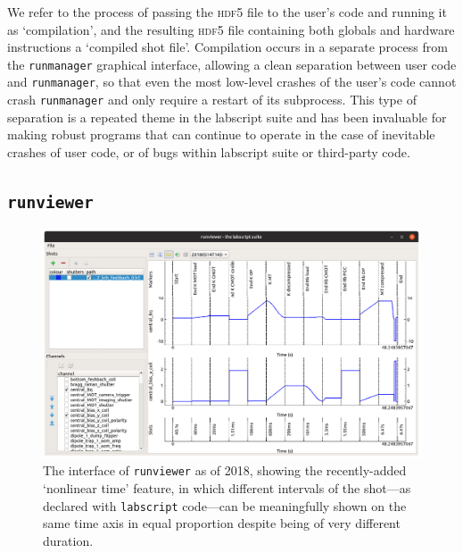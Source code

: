 We refer to the process of passing the \textsc{hdf5} file to the user's code and running it as `compilation', and the resulting \textsc{hdf5} file containing both globals and hardware instructions a `compiled shot file'. Compilation occurs in a separate process from the \texttt{runmanager} graphical interface, allowing a clean separation between user code and \texttt{runmanager}, so that even the most low-level crashes of the user's code cannot crash \texttt{runmanager} and only require a restart of its subprocess. This type of separation is a repeated theme in the labscript suite and has been invaluable for making robust programs that can continue to operate in the case of inevitable crashes of user code, or of bugs within labscript suite or third-party code.

\subsection{\texttt{runviewer}}

\begin{figure}[t]
\begin{center}
\includegraphics[width=\textwidth]{figures/software/new_screenshots/runviewer.png}
\caption{The interface of \texttt{runviewer} as of 2018, showing the recently-added `nonlinear time' feature, in which different intervals of the shot---as declared with \texttt{labscript} code---can be meaningfully shown on the same time axis in equal proportion despite being of very different duration.}\label{fig:runviewer}
\end{center}
\end{figure}

